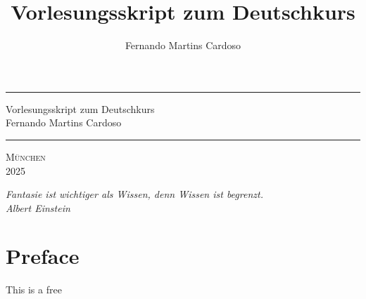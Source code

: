 \documentclass[12pt,a4paper,twoside]{book}
\title{Vorlesungsskript zum Deutschkurs}
\author{Fernando Martins Cardoso}
\begin{document}
\thispagestyle{empty}
\newcommand{\HRule}{\rule{\linewidth}{1mm}}
\setlength{\parindent}{0mm}
\setlength{\parskip}{0mm}
 \HRule
 \begin{flushright}
  \Huge Vorlesungsskript zum Deutschkurs\\[5mm]
        \huge Fernando Martins Cardoso
 \end{flushright}
 \HRule
 \begin{center}
  \Large\textsc{München\\ 2025}
 \end{center}
 
\newpage
\topmargin 7.2in
\thispagestyle{empty}
\begin{flushright}
\textit{Fantasie ist wichtiger als Wissen, denn Wissen ist begrenzt.\\Albert Einstein}
\end{flushright}

\newpage
\hoffset -1in           %
\voffset -1in           %
\marginparwidth 0pt     %
\marginparsep 0pt       %
\parindent 12pt         %
\parskip 4pt            %
\topmargin 1cm          %
\headheight 15pt        %
\headsep 20pt           %
\oddsidemargin 2.5cm    %
\evensidemargin 2cm     %
\footskip 40pt

\chapter*{Preface}
This is a free 

\tableofcontents

\newpage
{}

\pagestyle{fancy}                   %
\fancyhf{}                          %
\fancyfoot[LE]{\thepage}             %
\fancyfoot[RO]{\thepage}


%


\end{document}

